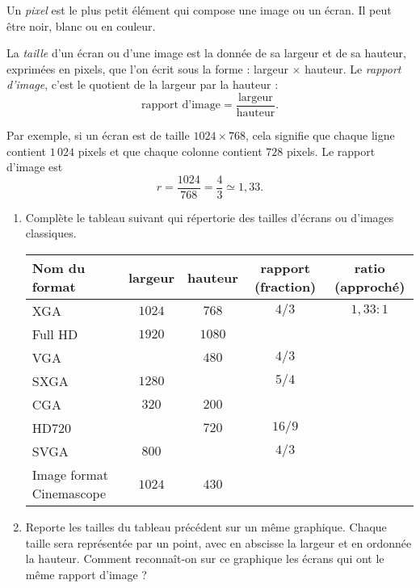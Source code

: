 \documentclass[class=report,crop=false, 12pt]{standalone}
\begin{document}

Un \emph{pixel} est le plus petit élément qui compose une image ou un écran. Il peut être noir, blanc ou en couleur.

\bigskip
\bigskip

\begin{activite}
La \emph{taille} d'un écran ou d'une image est la donnée de sa largeur et de sa hauteur, exprimées en pixels, que l'on écrit sous la forme : largeur $\times$ hauteur. Le \emph{rapport d'image}, c'est le quotient de la largeur par la hauteur :
$$\text{rapport d'image} = \frac{\text{largeur}}{\text{hauteur}}.$$

Par exemple, si un écran est de taille $1024 \times 768$, cela signifie que chaque ligne contient $1\,024$ pixels et que chaque colonne contient $728$ pixels. Le rapport d'image est
$$r = \frac{1024}{768} = \frac{4}{3} \simeq 1,33.$$



\begin{enumerate}
   \item Complète le tableau suivant qui répertorie  des tailles d'écrans ou d'images classiques.
   
   
\begin{tabular}{|l|c|c|c|c|} 
\hline
Nom du format & largeur & hauteur & rapport (fraction) & ratio (approché) \\ \hline \hline
XGA & $1024$ & $768$ & $4/3$ & $1,33:1$ \\ \hline
Full HD & $1920$ & $1080$ & & \\ \hline
VGA &  & $480$ & $4/3$ & \\ \hline
SXGA & $1280$ & & $5/4$ & \\ \hline 
CGA & $320$ & $200$ & & \\ \hline
HD720 & & $720$ & $16/9$ & \\ \hline 
SVGA & $800$ & & $4/3$ &  \\ \hline
Image format Cinemascope & $1024$ & $430$ & & \\ \hline  
\end{tabular}
 
 
\item Reporte les tailles du tableau précédent sur un même graphique. Chaque taille sera représentée par un point, avec en abscisse la largeur et en ordonnée la hauteur. 
Comment reconnaît-on sur ce graphique les écrans qui ont le même rapport d'image ?


\end{enumerate}

\end{activite}
\end{document}
